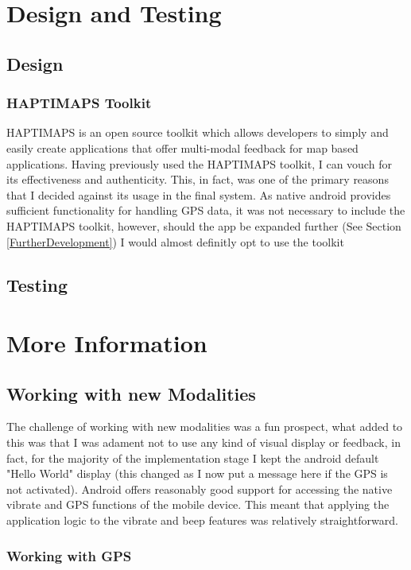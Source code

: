 \documentclass[12pt]{article} %
\begin{document}
\section{Design and Testing} %
\subsection{Design}
\subsubsection{HAPTIMAPS Toolkit}
HAPTIMAPS is an open source toolkit which allows developers to simply and easily create
applications that offer multi-modal feedback for map based applications. Having previously used the
HAPTIMAPS toolkit, I can vouch for its effectiveness and authenticity. This, in fact, was one of
the primary reasons that I decided against its usage in the final system. As native android
provides sufficient functionality for handling GPS data, it was not necessary to include the
HAPTIMAPS toolkit, however, should the app be expanded further (See Section 
\ref{FurtherDevelopment}) I would almost definitly opt to use the toolkit
\subsection{Testing}


\newpage
\section{More Information}
\subsection{Working with new Modalities}

The challenge of working with new modalities was a fun prospect, what added to this was that I was
adament not to use any kind of visual display or feedback, in fact, for the majority of the
implementation stage I kept the android default "Hello World" display (this changed as I now put a
message here if the GPS is not activated). Android offers reasonably good support for accessing the
native vibrate and GPS functions of the mobile device. This meant that applying the application
logic to the vibrate and beep features was relatively straightforward.


\subsubsection{Working with GPS}
\end{document}
